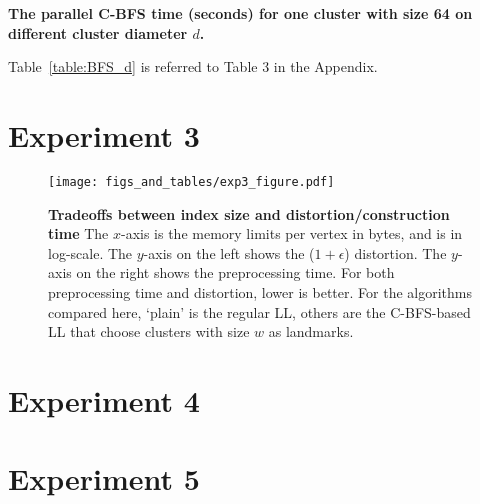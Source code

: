 \documentclass{article}
\begin{document}
\begin{table}[htbp]
  \centering
  \footnotesize
  
  \caption{
    \small\textbf{The parallel C-BFS time (seconds) for one cluster with size 64 on different cluster diameter $d$.} 
    \label{table:BFS_d}
  }
\end{table}
Table~\ref{table:BFS_d} is referred to Table 3 in the Appendix. 

\section{Experiment 3}
\begin{figure}
  \centering
  \texttt{[image: figs\_and\_tables/exp3\_figure.pdf]}    \caption{\small \textbf{Tradeoffs between index size and distortion/construction time}
  The $x$-axis is the memory limits per vertex in bytes, and is in log-scale. The $y$-axis on the left shows the ($1+\epsilon$) distortion.  The $y$-axis on the right shows the preprocessing time. For both preprocessing time and
  distortion, lower is better. For the algorithms compared here, `plain' is the regular LL, others are the C-BFS-based LL that choose clusters with size $w$ as landmarks.
  \label{fig:approx}
  }
\end{figure} 

\section{Experiment 4}

\section{Experiment 5}
\end{document}
